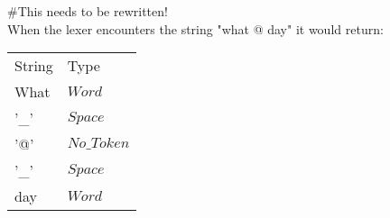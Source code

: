 \begin{example}
\#This needs to be rewritten!\\
 When the lexer encounters the
string "what @ day" it would return:
\begin{center}
\begin{tabular}{ll}
String & Type\\
What & $Word$\\
'\_' & $Space$\\
'@' & $No\_Token$\\
'\_' & $Space$\\
day & $Word$\\
\end{tabular}
\end{center}
\end{example}
